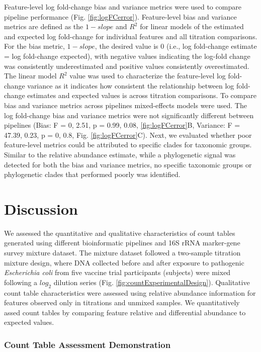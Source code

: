\documentclass{bmcart}
\begin{document}
Feature-level log fold-change bias and variance metrics were used to
compare pipeline performance (Fig. \ref{fig:logFCerror}). Feature-level
bias and variance metrics are defined as the \(1 - slope\) and \(R^2\)
for linear models of the estimated and expected log fold-change for
individual features and all titration comparisons. For the bias metric,
\(1 - slope\), the desired value is 0 (i.e., log fold-change estimate =
log fold-change expected), with negative values indicating the log-fold
change was consistently underestimated and positive values consistently
overestimated. The linear model \(R^2\) value was used to characterize
the feature-level log fold-change variance as it indicates how
consistent the relationship between log fold-change estimates and
expected values is across titration comparisons. To compare bias and
variance metrics across pipelines mixed-effects models were used. The
log fold-change bias and variance metrics were not significantly
different between pipelines (Bias: F = 0, 2.51, p = 0.99, 0.08,
\ref{fig:logFCerror}B, Variance: F = 47.39, 0.23, p = 0, 0.8, Fig.
\ref{fig:logFCerror}C). Next, we evaluated whether poor feature-level
metrics could be attributed to specific clades for taxonomic groups.
Similar to the relative abundance estimate, while a phylogenetic signal
was detected for both the bias and variance metrics, no specific
taxonomic groups or phylogenetic clades that performed poorly was
identified.


\section*{Discussion}

We assessed the quantitative and qualitative characteristics of count
tables generated using different bioinformatic pipelines and 16S rRNA
marker-gene survey mixture dataset. The mixture dataset followed a
two-sample titration mixture design, where DNA collected before and
after exposure to pathogenic \emph{Escherichia coli} from five vaccine
trial participants (subjects) were mixed following a \(log_2\) dilution
series (Fig. \ref{fig:countExperimentalDesign}). Qualitative count table
characteristics were assessed using relative abundance information for
features observed only in titrations and unmixed samples. We
quantitatively assed count tables by comparing feature relative and
differential abundance to expected values.

\subsubsection*{Count Table Assessment Demonstration}
\end{document}
